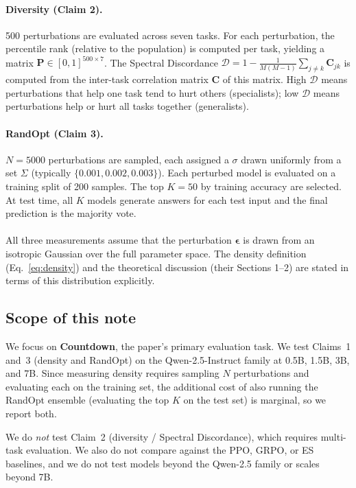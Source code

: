 \documentclass[11pt]{article}
\begin{document}
\paragraph{Diversity (Claim 2).} 500 perturbations are evaluated across seven tasks. For each perturbation, the percentile rank (relative to the population) is computed per task, yielding a matrix $\mathbf{P}\in[0,1]^{500\times 7}$. The Spectral Discordance $\mathcal{D}=1-\frac{1}{M(M-1)}\sum_{j\neq k}\mathbf{C}_{jk}$ is computed from the inter-task correlation matrix $\mathbf{C}$ of this matrix. High $\mathcal{D}$ means perturbations that help one task tend to hurt others (specialists); low $\mathcal{D}$ means perturbations help or hurt all tasks together (generalists).

\paragraph{RandOpt (Claim 3).} $N=5000$ perturbations are sampled, each assigned a $\sigma$ drawn uniformly from a set $\Sigma$ (typically $\{0.001, 0.002, 0.003\}$). Each perturbed model is evaluated on a training split of 200 samples. The top $K=50$ by training accuracy are selected. At test time, all $K$ models generate answers for each test input and the final prediction is the majority vote.

\paragraph{} All three measurements assume that the perturbation $\boldsymbol{\epsilon}$ is drawn from an isotropic Gaussian over the full parameter space. The density definition (Eq.~\ref{eq:density}) and the theoretical discussion (their Sections 1--2) are stated in terms of this distribution explicitly.

\subsection{Scope of this note}\label{sec:scope}

We focus on \textbf{Countdown}, the paper's primary evaluation task. We test Claims~1 and~3 (density and RandOpt) on the Qwen-2.5-Instruct family at 0.5B, 1.5B, 3B, and 7B. Since measuring density requires sampling $N$ perturbations and evaluating each on the training set, the additional cost of also running the RandOpt ensemble (evaluating the top $K$ on the test set) is marginal, so we report both.

We do \emph{not} test Claim~2 (diversity / Spectral Discordance), which requires multi-task evaluation. We also do not compare against the PPO, GRPO, or ES baselines, and we do not test models beyond the Qwen-2.5 family or scales beyond 7B.
\end{document}
